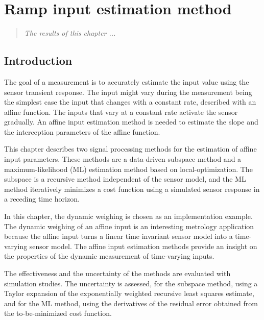 

\glsresetall

\chapter{Ramp input estimation method}\label{chap:RampInput}

\begin{quote}
\emph{The results of this chapter ...}\vfill{}
\end{quote}


\section{Introduction}

The goal of a measurement is to accurately estimate the input value using the sensor transient response.
The input might vary during the measurement being the simplest case the input that changes with a constant rate, described with an affine function.
The inputs that vary at a constant rate activate the sensor gradually. 
An affine input estimation method is needed to estimate the slope and the interception parameters of the affine function.

This chapter describes two signal processing methods for the estimation of affine input parameters.
These methods are a data-driven subspace method and a maximum-likelihood (ML) estimation method based on local-optimization.
The subspace is a recursive method independent of the sensor model, and the ML method iteratively minimizes a cost function using a simulated sensor response in a receding time horizon.

In this chapter, the dynamic weighing is chosen as an implementation example.
The dynamic weighing of an affine input is an interesting metrology application because the affine input turns a linear time invariant sensor model into a time-varying sensor model.
The affine input estimation methods provide an insight on the properties of the dynamic measurement of time-varying inputs.

The effectiveness and the uncertainty of the methods are evaluated with simulation studies.
The uncertainty is assessed, for the subspace method, using a Taylor expansion of the exponentially weighted recursive least squares estimate, and
for the ML method, using the derivatives of the residual error obtained from the to-be-minimized cost function.

